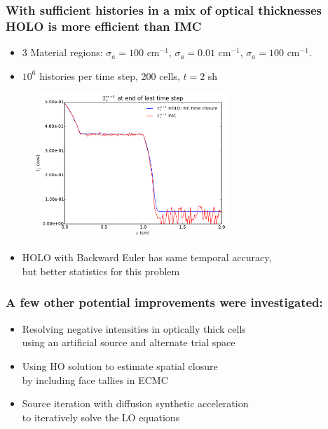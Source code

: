 \documentclass[xcolor=dvipsnames,hyperref={pdfpagelabels=false},unknownkeysallowed]{beamer}
\newcommand{\colG}[1]{{\color{Gray!110} #1}}
\newlength{\wideitemsep}
\let\olditem\item
\renewcommand{\item}{\setlength{\itemsep}{\wideitemsep}\olditem}
\begin{document}
\begin{frame}
    \frametitle{With sufficient histories in a mix of optical thicknesses \\ HOLO is more efficient than IMC}
    \fontsize{8.0pt}{10.0pt}\selectfont
    \vspace{0.1in}
    \begin{itemize}
        \item 3 Material regions: $\sigma_a=100$ cm$^{-1}$, $\sigma_a=0.01$ cm$^{-1}$,
        $\sigma_a = 100$ cm$^{-1}$. 
    \item \vspace{-0.1in} $10^6$ histories per time step, 200 cells, $t=2$ sh
            \pause
    \end{itemize}
    \begin{figure}
        \includegraphics[width=0.65\textwidth]{thick_thin_compare.pdf}
    \end{figure}
    \begin{itemize}
            \pause
            \vspace{-0.1in}
        \item  HOLO with Backward Euler has same temporal accuracy, \\ but better statistics for this
            problem
    \end{itemize}
\end{frame}

\begin{frame}
    \frametitle{A few other potential improvements were investigated:}
    {\addtolength\wideitemsep{5pt}
        \begin{itemize}
            \item[] Resolving negative intensities in optically thick cells \\
            \colG{using an artificial source and alternate trial space}
        \item[] Using HO solution to estimate spatial closure \\
                \colG{by including face tallies in ECMC}
            \item[] Source iteration with diffusion synthetic acceleration \\ \colG{to
                    iteratively solve the LO equations}
        \end{itemize}}
\end{frame}
\end{document}
